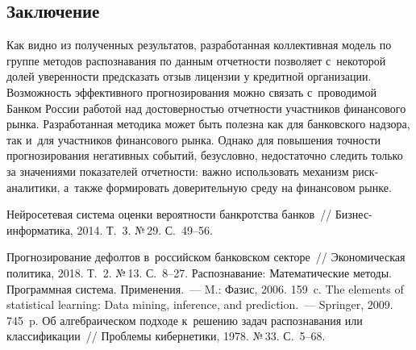 \begin{multicols}{2}
\vspace*{-6pt}
      
\section{Заключение}

\vspace*{-2pt}

      Как видно из полученных результатов, разработанная коллективная 
модель по группе методов распознавания по данным отчетности позволяет 
с~некоторой долей уверенности предсказать отзыв лицензии у кредитной 
организации. Возможность эффективного прогнозирования можно связать 
с~проводимой Банком России работой над достоверностью отчетности 
участников финансового рынка. Разработанная методика может быть полезна 
как для банковского надзора, так и~для участников финансового рынка. 
Однако для повышения точности прогнозирования негативных событий, 
безусловно, недостаточно следить только за значениями показателей 
отчетности: важно использовать механизм риск-ана\-ли\-ти\-ки, а~также 
формировать доверительную среду на финансовом рынке.

\vspace*{-6pt}
      
   {\small\frenchspacing
 {%
 \begin{thebibliography}{9}
 
 \vspace*{-2pt}
 
 
 Нейросетевая система оценки 
вероятности банкротства банков~// Биз\-нес-ин\-фор\-ма\-ти\-ка, 2014.  Т.~3. №\,29. 
С.~49--56.
{

}
 Прогнозирование 
дефолтов в~российском банковском секторе~// Экономическая политика, 2018. Т.~2. 
№\,13. С.~8--27.
 Распознавание: Математические 
методы. Программная система. Применения.~--- M.: Фазис, 2006. 159~c.
 The elements of statistical learning: Data 
mining, inference, and prediction.~--- Springer, 2009. 745~p.
 Об алгебраическом подходе к~решению задач распознавания или 
классификации~// Проб\-ле\-мы кибернетики, 1978. №\,33. С.~5--68.


\end{thebibliography}}}
\end{multicols}
